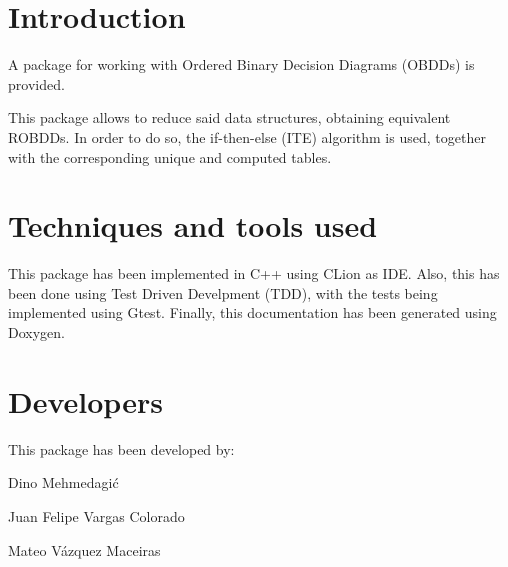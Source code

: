 \hypertarget{index_intro_sec}{}\section{Introduction}\label{index_intro_sec}
A package for working with Ordered Binary Decision Diagrams (O\+B\+D\+Ds) is provided.

This package allows to reduce said data structures, obtaining equivalent R\+O\+B\+D\+Ds. In order to do so, the if-\/then-\/else (I\+TE) algorithm is used, together with the corresponding unique and computed tables.\hypertarget{index_used_sec}{}\section{Techniques and tools used}\label{index_used_sec}
This package has been implemented in C++ using C\+Lion as I\+DE. Also, this has been done using Test Driven Develpment (T\+DD), with the tests being implemented using Gtest. Finally, this documentation has been generated using Doxygen.\hypertarget{index_devs_sec}{}\section{Developers}\label{index_devs_sec}
This package has been developed by\+:
\begin{DoxyItemize}
\item Dino Mehmedagić
\item Juan Felipe Vargas Colorado
\item Mateo Vázquez Maceiras 
\end{DoxyItemize}
